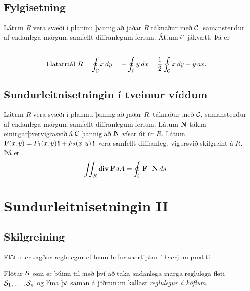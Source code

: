 \documentclass[a4paper,10pt,icelandic]{sphinxmanual}
\begin{document}
\subsection{Fylgisetning}
\label{Kafli6:fylgisetning}
Látum \(R\) vera svæði í planinu þannig að jaðar \(R\) táknaður
með \(\cal C\), samanstendur af endanlega mörgum samfellt
diffranlegum ferlum. Áttum \(\cal C\) jákvætt. Þá er
\begin{gather}
\begin{split}\displaystyle\end{split}\notag\\\begin{split}\mbox{Flatarmál } R=\oint_{\cal C}x\,dy=
-\oint_{\cal C}y\,dx=\frac{1}{2}\oint_{\cal C}x\,dy-y\,dx.\end{split}\notag
\end{gather}

\subsection{Sundurleitnisetningin í tveimur víddum}
\label{Kafli6:sundurleitnisetningin-i-tveimur-viddum}
Látum \(R\) vera svæði í planinu þannig að jaðar \(R\), táknaður
með \(\cal C\), samanstendur af endanlega mörgum samfellt
diffranlegum ferlum. Látum \(\mbox{${\bf N}$}\) tákna
einingarþvervigrasvið á \(\cal C\) þannig að
\(\mbox{${\bf N}$}\) vísar út úr \(R\). Látum
\(\mbox{${\bf F}$}(x,y)=F_1(x,y)\,\mbox{${\bf i}$}+F_2(x,y)\,\mbox{${\bf j}$}\)
vera samfellt diffranlegt vigursvið skilgreint á \(R\). Þá er
\begin{gather}
\begin{split}\displaystyle \int\!\!\!\int_R\mbox{${\rm\bf div\,}$}\mbox{${\bf F}$}\,dA=\oint_{\cal C} \mbox{${\bf F}$}\cdot\mbox{${\bf N}$}\,ds.\end{split}\notag
\end{gather}

\section{Sundurleitnisetningin II}
\label{Kafli6:sundurleitnisetningin-ii}

\subsection{Skilgreining}
\label{Kafli6:id8}
Flötur er sagður reglulegur ef hann hefur snertiplan í hverjum punkti.

Flötur \(\cal S\) sem er búinn til með því að taka endanlega marga
reglulega fleti \({\cal S}_1, \ldots, {\cal S}_n\) og líma þá saman
á jöðrunum kallast \emph{reglulegur á köflum}.
\end{document}

